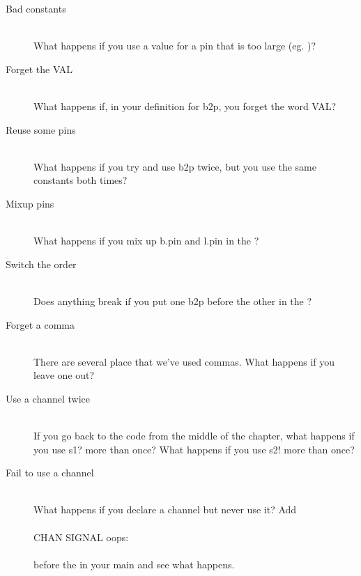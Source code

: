 \begin{description}
	\item[Bad constants]\ \\
	What happens if you use a value for a pin that is too large (eg. {})?
	\item[Forget the {\keyword VAL}]\ \\
	What happens if, in your definition for {\code b2p}, you forget the word {\keyword VAL}?
	\item[Reuse some pins]\ \\
	What happens if you try and use {\code b2p} twice, but you use the same constants both times?
	\item[Mixup pins]\ \\
	What happens if you mix up {\code b.pin} and {\code l.pin} in the ?
	\item[Switch the order]\ \\
	Does anything break if you put one {\code b2p} before the other in the \PAR?
	\item[Forget a comma]\ \\
	There are several place that we've used commas. What happens if you leave one out?
	\item[Use a channel twice]\ \\
	If you go back to the code from the middle of the chapter, what happens if you use {\code s1?} more than once? What happens if you use {\code s2!} more than once?
	\item[Fail to use a channel]\ \\
	What happens if you declare a channel but never use it? Add \\
	\ \\
	{\code CHAN SIGNAL oops:} \\
	\ \\
	before the \PAR in your {\code main} and see what happens.
\end{description}
